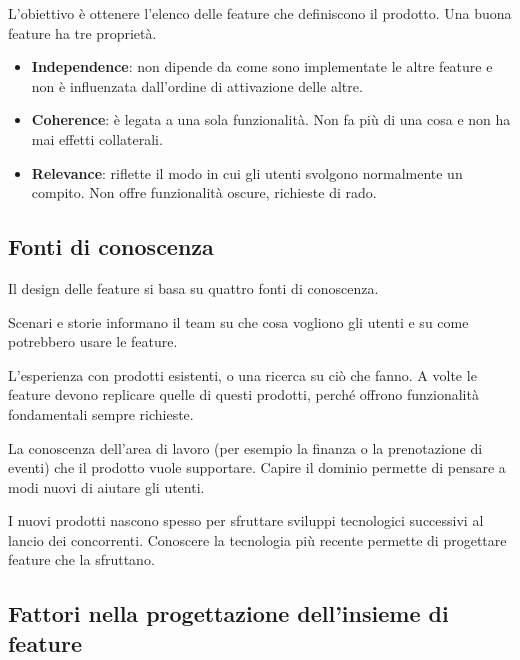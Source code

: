 L'obiettivo è ottenere l'elenco delle feature che definiscono il prodotto. Una buona feature ha tre proprietà.

\begin{definizione}
\begin{itemize}
  \item \textbf{Independence}: non dipende da come sono implementate le altre feature e non è influenzata dall'ordine
    di attivazione delle altre.
  \item \textbf{Coherence}: è legata a una sola funzionalità. Non fa più di una cosa e non ha mai effetti collaterali.
  \item \textbf{Relevance}: riflette il modo in cui gli utenti svolgono normalmente un compito. Non offre
    funzionalità oscure, richieste di rado.
\end{itemize}
\end{definizione}

\subsection*{Fonti di conoscenza}

Il design delle feature si basa su quattro fonti di conoscenza.

\begin{description}[leftmargin=0pt, style=unboxed]
  \item[User knowledge.] Scenari e storie informano il team su che cosa vogliono gli utenti e su come potrebbero usare le
    feature.
  \item[Product knowledge.] L'esperienza con prodotti esistenti, o una ricerca su ciò che fanno. A volte le feature
    devono replicare quelle di questi prodotti, perché offrono funzionalità fondamentali sempre richieste.
  \item[Domain knowledge.] La conoscenza dell'area di lavoro (per esempio la finanza o la prenotazione di eventi) che
    il prodotto vuole supportare. Capire il dominio permette di pensare a modi nuovi di aiutare gli utenti.
  \item[Technology knowledge.] I nuovi prodotti nascono spesso per sfruttare sviluppi tecnologici successivi
    al lancio dei concorrenti. Conoscere la tecnologia più recente permette di progettare feature che la sfruttano.
\end{description}

\subsection*{Fattori nella progettazione dell'insieme di feature}

